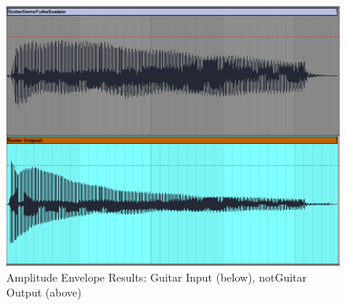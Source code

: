 \documentclass[12pt]{article}
\begin{document}
\setlength{\belowcaptionskip}{5pt}
\begin{figure}[H]
\includegraphics[scale=0.6]{Pictures/Final_pic.PNG}
\centering
\caption{Amplitude Envelope Results: Guitar Input (below), notGuitar Output (above)}
\centering
\end{figure}
\end{document}
